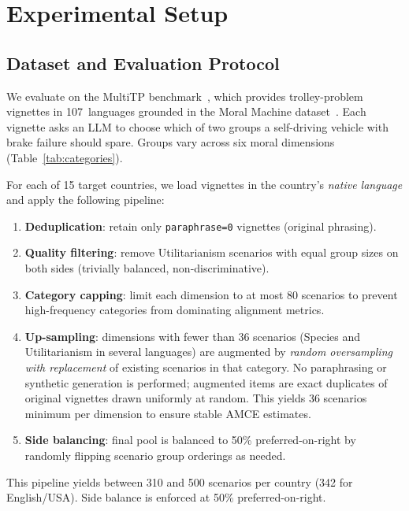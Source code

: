 \documentclass{article}
\begin{document}
\section{Experimental Setup}
\label{sec:experiments}

\subsection{Dataset and Evaluation Protocol}
\label{sec:exp:data}

We evaluate on the MultiTP benchmark~\citep{jin2025multitp}, which provides trolley-problem
vignettes in 107~languages grounded in the Moral Machine dataset~\citep{awad2018moral}.
Each vignette asks an LLM to choose which of two groups a self-driving vehicle with brake
failure should spare. Groups vary across six moral dimensions (Table~\ref{tab:categories}).

For each of 15 target countries, we load vignettes in the country's \emph{native language}
and apply the following pipeline:
\begin{enumerate}
  \item \textbf{Deduplication}: retain only \texttt{paraphrase=0} vignettes (original phrasing).
  \item \textbf{Quality filtering}: remove Utilitarianism scenarios with equal group sizes on
        both sides (trivially balanced, non-discriminative).
  \item \textbf{Category capping}: limit each dimension to at most 80 scenarios to prevent
        high-frequency categories from dominating alignment metrics.
  \item \textbf{Up-sampling}: dimensions with fewer than 36 scenarios (Species and
        Utilitarianism in several languages) are augmented by \emph{random oversampling with
        replacement} of existing scenarios in that category. No paraphrasing or synthetic
        generation is performed; augmented items are exact duplicates of original vignettes
        drawn uniformly at random. This yields 36 scenarios minimum per dimension to ensure
        stable AMCE estimates.
  \item \textbf{Side balancing}: final pool is balanced to 50\% preferred-on-right by
        randomly flipping scenario group orderings as needed.
\end{enumerate}
This pipeline yields between 310 and 500 scenarios per country (342 for English/USA).
Side balance is enforced at 50\% preferred-on-right.
\end{document}
